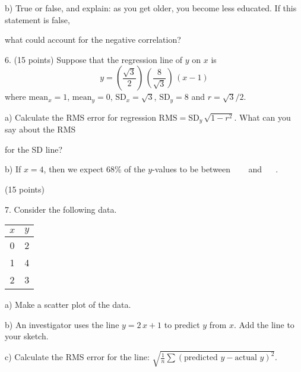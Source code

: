 \documentclass[10pt]{article}
\begin{document}
\hspace{20pt} b) True or false, and explain:  as you get older, you become less educated.  
If this statement is false,\vspace{-4pt}

\hspace{20pt} \hphantom{a) }
what could account for the negative correlation?  
\vspace{2in}


6. (15 points) Suppose that the regression line of $y$ on $x$ 
is \[y=\left(\frac{\sqrt{3}}{2}\right)\,\left(\frac{8}{\sqrt{3}}\right)\,(x-1)\] 
where $\mbox{mean}_x=1$, $\mbox{mean}_y=0$, $\mbox{SD}_x=\sqrt{3}$, $\mbox{SD}_y=8$
and $r=\sqrt{3}/2$.\vspace{3pt}

\hspace{20pt} a) Calculate the RMS error for regression 
$\mbox{RMS}=\mbox{SD}_y\,\sqrt{1-r^2}$.  What can you say about the RMS\vspace{-4pt}

\hspace{20pt}\hphantom{b) } for the SD line?
\vspace{2in}

\hspace{20pt} b) If $x=4$, then we expect 68\% of the $y$-values to be
between \ \underline{\hspace{60pt}} \ \ and \  \underline{\hspace{60pt}} \ .
\vspace{2in}



\vfill
\eject

(15 points)

7. Consider the following data.
\begin{tabular}{|c|c|}\hline
$x$ & $y$\\\hline
0   & 2\\
1   & 4\\
2   & 3\\\hline
\end{tabular}

\hspace{10pt} a) Make a scatter plot of the data.  
\vspace{3.5in}

\hspace{10pt} b) An investigator uses the line $y=2\,x + 1$ to predict $y$ from $x$.
Add the line to your sketch.
\medskip

\hspace{10pt} c) Calculate the RMS error for the line:
$\displaystyle\sqrt{\frac{1}{n}\sum\left(\mbox{predicted $y$} - \mbox{actual $y$}\right)^2}$.
\vspace{2.8in}
\vfill
\eject
\end{document}
